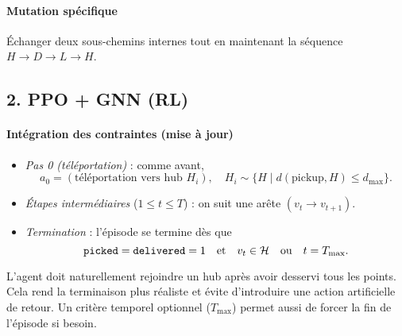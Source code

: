 \documentclass[11pt,a4paper]{article}
\begin{document}
\paragraph{Mutation spécifique}  
Échanger deux sous-chemins internes tout en maintenant la séquence \(H\to D\to L\to H\).

\subsection{2. PPO + GNN (RL)}
\label{sec:rl_gnn}

\paragraph{Intégration des contraintes (mise à jour)}  
\begin{itemize}
  \item \emph{Pas 0 (téléportation)} : comme avant,  
    \[
      a_0 = (\text{téléportation vers hub }H_i),\quad H_i\sim\{H\mid d(\text{pickup},H)\le d_{\max}\}.
    \]
  \item \emph{Étapes intermédiaires} (\(1\le t \le T\)) : on suit une arête \((v_t\to v_{t+1})\).
  \item \emph{Termination} : l’épisode se termine dès que  
    \[
      \text{\texttt{picked}}=\text{\texttt{delivered}}=1
      \quad\text{et}\quad
      v_t\in\mathcal{H}
      \quad\text{ou}\quad
      t=T_{\max}.
    \]
\end{itemize}

L’agent doit naturellement rejoindre un hub après avoir desservi tous les points. Cela rend la terminaison plus réaliste et évite d’introduire une action artificielle de retour. Un critère temporel optionnel (\(T_{\max}\)) permet aussi de forcer la fin de l’épisode si besoin.
\end{document}
